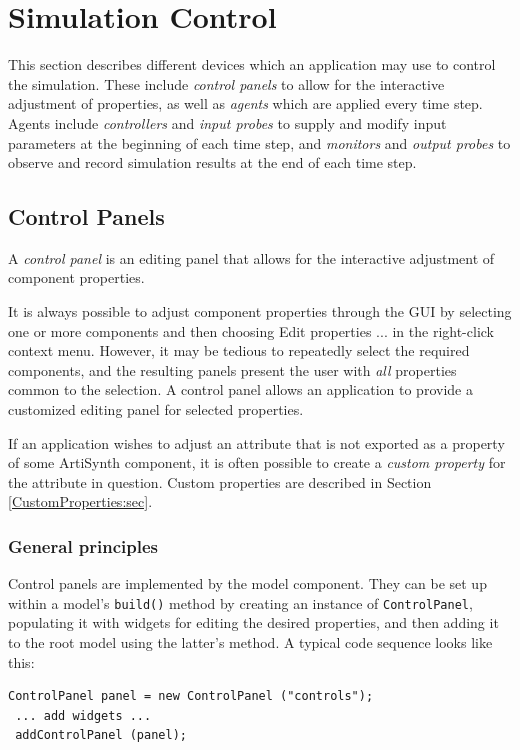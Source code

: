 \ifdefined\maindoc\else
\def\doctitle{Simulation Control}

\mainmatter
\fi

\chapter{Simulation Control}
\label{SimulationControl:sec}

This section describes different devices which an application may use
to control the simulation. These include {\it control panels} to allow
for the interactive adjustment of properties, as well as {\it agents}
which are applied every time step. Agents include {\it controllers}
and {\it input probes} to supply and modify input parameters at the
beginning of each time step, and {\it monitors} and {\it output
probes} to observe and record simulation results at the end of each
time step.

\section{Control Panels}
\label{ControlPanels:sec}

A {\it control panel} is an editing panel that allows for the
interactive adjustment of component properties.

It is always possible to adjust component properties through the GUI
by selecting one or more components and then choosing {\sf Edit
properties ...} in the right-click context menu. However, it may be
tedious to repeatedly select the required components, and the
resulting panels present the user with {\it all} properties common to
the selection.  A control panel allows an application to provide a
customized editing panel for selected properties.

\begin{sideblock}
If an application wishes to adjust an attribute that is not exported
as a property of some ArtiSynth component, it is often possible to
create a {\it custom property} for the attribute in question.
Custom properties are described in Section \ref{CustomProperties:sec}.
\end{sideblock}

\subsection{General principles}
\label{ControlPanelGeneral:sec}

Control panels are implemented by the
 model component.  They
can be set up within a model's {\tt build()} method by creating an
instance of {\tt ControlPanel}, populating it with widgets for editing
the desired properties, and then adding it to the root model using the
latter's
method. A typical code sequence looks like this:
%
\begin{lstlisting}[]
 ControlPanel panel = new ControlPanel ("controls");
 ... add widgets ... 
 addControlPanel (panel);
\end{lstlisting}
%

